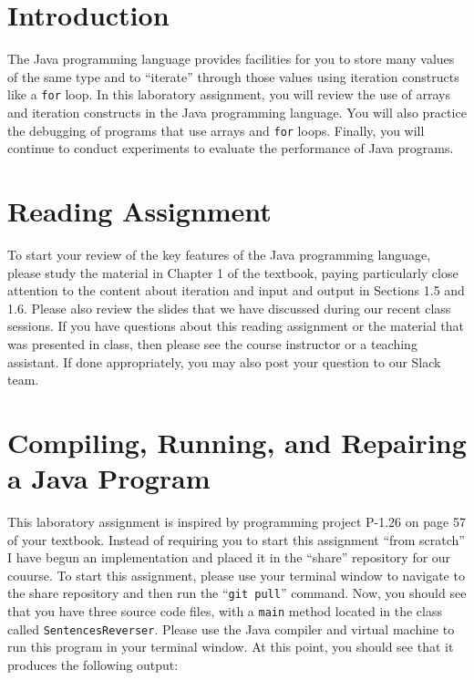 

\usepackage[compact]{titlesec}



\section*{Introduction}

The Java programming language provides facilities for you to store many values of the same type and to ``iterate''
through those values using iteration constructs like a {\tt for} loop. In this laboratory assignment, you will review
the use of arrays and iteration constructs in the Java programming language. You will also practice the debugging of
programs that use arrays and {\tt for} loops. Finally, you will continue to conduct experiments to evaluate the
performance of Java programs.

\section*{Reading Assignment}

To start your review of the key features of the Java programming language, please study the material in Chapter 1 of the
textbook, paying particularly close attention to the content about iteration and input and output in Sections 1.5 and
1.6. Please also review the slides that we have discussed during our recent class sessions. If you have questions about
this reading assignment or the material that was presented in class, then please see the course instructor or a teaching
assistant. If done appropriately, you may also post your question to our Slack team.

\section*{Compiling, Running, and Repairing a Java Program}

This laboratory assignment is inspired by programming project P-1.26 on page 57 of your textbook. Instead of requiring
you to start this assignment ``from scratch'' I have begun an implementation and placed it in the ``share'' repository
for our couurse. To start this assignment, please use your terminal window to navigate to the share repository and then
run the ``{\tt git pull}'' command. Now, you should see that you have three source code files, with a {\tt main}
method located in the class called {\tt SentencesReverser}. Please use the Java compiler and virtual machine to run this
program in your terminal window. At this point, you should see that it produces the following output:

